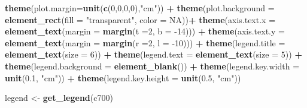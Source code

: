 \documentclass[12pt,twoside]{reedthesis}
\newenvironment{Shaded}{\begin{snugshade}}{\end{snugshade}}
\newcommand{\DataTypeTok}[1]{\textcolor[rgb]{0.13,0.29,0.53}{#1}}
\newcommand{\DecValTok}[1]{\textcolor[rgb]{0.00,0.00,0.81}{#1}}
\newcommand{\FloatTok}[1]{\textcolor[rgb]{0.00,0.00,0.81}{#1}}
\newcommand{\KeywordTok}[1]{\textcolor[rgb]{0.13,0.29,0.53}{\textbf{#1}}}
\newcommand{\NormalTok}[1]{#1}
\newcommand{\OperatorTok}[1]{\textcolor[rgb]{0.81,0.36,0.00}{\textbf{#1}}}
\newcommand{\OtherTok}[1]{\textcolor[rgb]{0.56,0.35,0.01}{#1}}
\newcommand{\StringTok}[1]{\textcolor[rgb]{0.31,0.60,0.02}{#1}}
\begin{document}
\begin{Shaded}
\begin{Highlighting}[]
\StringTok{  }\KeywordTok{theme}\NormalTok{(}\DataTypeTok{plot.margin=}\KeywordTok{unit}\NormalTok{(}\KeywordTok{c}\NormalTok{(}\DecValTok{0}\NormalTok{,}\DecValTok{0}\NormalTok{,}\DecValTok{0}\NormalTok{,}\DecValTok{0}\NormalTok{),}\StringTok{"cm"}\NormalTok{)) }\OperatorTok{+}
\StringTok{  }\KeywordTok{theme}\NormalTok{(}\DataTypeTok{plot.background =} \KeywordTok{element_rect}\NormalTok{(}\DataTypeTok{fill =} \StringTok{"transparent"}\NormalTok{, }\DataTypeTok{color =} \OtherTok{NA}\NormalTok{))}\OperatorTok{+}
\StringTok{  }\KeywordTok{theme}\NormalTok{(}\DataTypeTok{axis.text.x =} \KeywordTok{element_text}\NormalTok{(}\DataTypeTok{margin =}  \KeywordTok{margin}\NormalTok{(}\DataTypeTok{t =}\DecValTok{2}\NormalTok{, }\DataTypeTok{b =} \DecValTok{-14}\NormalTok{))) }\OperatorTok{+}\StringTok{ }
\StringTok{  }\KeywordTok{theme}\NormalTok{(}\DataTypeTok{axis.text.y =} \KeywordTok{element_text}\NormalTok{(}\DataTypeTok{margin =}  \KeywordTok{margin}\NormalTok{(}\DataTypeTok{r =}\DecValTok{2}\NormalTok{, }\DataTypeTok{l =} \DecValTok{-10}\NormalTok{))) }\OperatorTok{+}
\StringTok{  }\KeywordTok{theme}\NormalTok{(}\DataTypeTok{legend.title =} \KeywordTok{element_text}\NormalTok{(}\DataTypeTok{size =} \DecValTok{6}\NormalTok{)) }\OperatorTok{+}
\StringTok{  }\KeywordTok{theme}\NormalTok{(}\DataTypeTok{legend.text =} \KeywordTok{element_text}\NormalTok{(}\DataTypeTok{size =} \DecValTok{5}\NormalTok{)) }\OperatorTok{+}\StringTok{ }
\StringTok{  }\KeywordTok{theme}\NormalTok{(}\DataTypeTok{legend.background =} \KeywordTok{element_blank}\NormalTok{()) }\OperatorTok{+}
\StringTok{  }\KeywordTok{theme}\NormalTok{(}\DataTypeTok{legend.key.width =} \KeywordTok{unit}\NormalTok{(}\FloatTok{0.1}\NormalTok{, }\StringTok{"cm"}\NormalTok{)) }\OperatorTok{+}
\StringTok{  }\KeywordTok{theme}\NormalTok{(}\DataTypeTok{legend.key.height =} \KeywordTok{unit}\NormalTok{(}\FloatTok{0.5}\NormalTok{, }\StringTok{"cm"}\NormalTok{))}

\NormalTok{legend <-}\StringTok{ }\KeywordTok{get_legend}\NormalTok{(c700)}


\end{Highlighting}
\end{Shaded}
\end{document}
